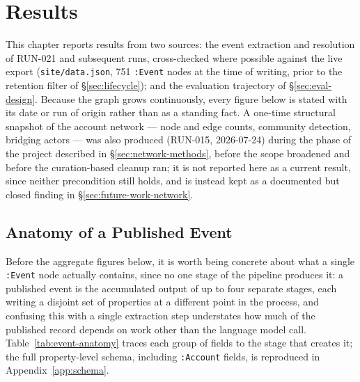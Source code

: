 \documentclass[12pt, a4paper]{report}
\begin{document}
\chapter{Results}
\label{ch:results}

This chapter reports results from two sources: the event extraction and
resolution of RUN-021 and subsequent runs, cross-checked where possible
against the live export (\texttt{site/data.json}, 751 \texttt{:Event}
nodes at the time of writing, prior to the retention filter of
\S\ref{sec:lifecycle}); and the evaluation trajectory of
\S\ref{sec:eval-design}. Because the graph grows continuously, every
figure below is stated with its date or run of origin rather than as a
standing fact. A one-time structural snapshot of the account network —
node and edge counts, community detection, bridging actors — was also
produced (RUN-015, 2026-07-24) during the phase of the project described
in \S\ref{sec:network-methods}, before the scope broadened and before the
curation-based cleanup ran; it is not reported here as a current result,
since neither precondition still holds, and is instead kept as a
documented but closed finding in \S\ref{sec:future-work-network}.

\section{Anatomy of a Published Event}
\label{sec:event-anatomy}

Before the aggregate figures below, it is worth being concrete about what
a single \texttt{:Event} node actually contains, since no one stage of
the pipeline produces it: a published event is the accumulated output of
up to four separate stages, each writing a disjoint set of properties at
a different point in the process, and confusing this with a single
extraction step understates how much of the published record depends on
work other than the language model call. Table~\ref{tab:event-anatomy}
traces each group of fields to the stage that creates it; the full
property-level schema, including \texttt{:Account} fields, is reproduced
in Appendix~\ref{app:schema}.
\end{document}
